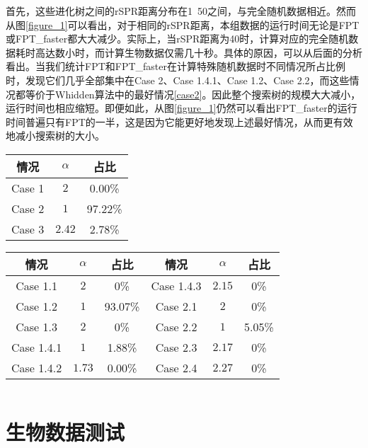 
首先，这些进化树之间的rSPR距离分布在1~50之间，与完全随机数据相近。然而从图\ref{figure_1}可以看出，对于相同的rSPR距离，本组数据的运行时间无论是FPT或FPT\_faster都大大减少。实际上，当rSPR距离为40时，计算对应的完全随机数据耗时高达数小时，而计算生物数据仅需几十秒。具体的原因，可以从后面的分析看出。当我们统计FPT和FPT\_faster在计算特殊随机数据时不同情况所占比例时，发现它们几乎全部集中在Case 2、Case 1.4.1、Case 1.2、Case 2.2，而这些情况都等价于Whidden算法中的最好情况\ref{case2}。因此整个搜索树的规模大大减小，运行时间也相应缩短。即便如此，从图\ref{figure_1}仍然可以看出FPT\_faster的运行时间普遍只有FPT的一半，这是因为它能更好地发现上述最好情况，从而更有效地减小搜索树的大小。


\begin{center}
\begin{table}[htpb]
\parbox{.34\linewidth}{
\centering
{}
\begin{tabular}{ c c c}
  \hline
      情况 & $\alpha$ & 占比\\  \hline
      Case 1 & $2$ & 0.00\% \\
      Case 2 & $1$ & 97.22\%\\
      Case 3 & $2.42$ & 2.78\% \\
  \hline
\end{tabular}
}
\hfill
\parbox{.6\linewidth}{
\centering
{}
\begin{tabular}{ c c c | c c c }
  \hline
      情况 & $\alpha$ & 占比 & 情况 & $\alpha$ & 占比\\  \hline
      Case 1.1 & $2$ & 0\% & Case 1.4.3 & $2.15$ &0\%  \\
      Case 1.2 & $1$ & 93.07\% & Case 2.1 & $2$ & 0\% \\
      Case 1.3 & $2$ & 0\% & Case 2.2 & $1$ & 5.05\% \\
      Case 1.4.1 & $1$ & 1.88\%  & Case 2.3 & $2.17$ & 0\% \\
      Case 1.4.2 & $1.73$ & 0.00\% & Case 2.4 & $2.27$ & 0\% \\
  \hline
\end{tabular}
}
\end{table}
\end{center}

$ $\\
\section{生物数据测试}

